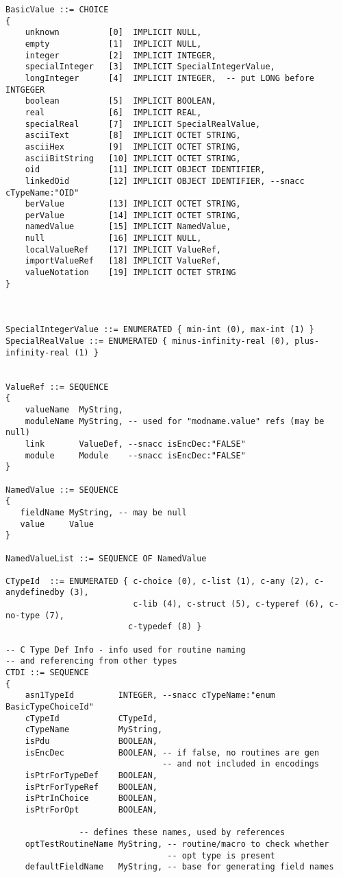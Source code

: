 \begin{small}
\begin{verbatim}
BasicValue ::= CHOICE
{
    unknown          [0]  IMPLICIT NULL,
    empty            [1]  IMPLICIT NULL,
    integer          [2]  IMPLICIT INTEGER,
    specialInteger   [3]  IMPLICIT SpecialIntegerValue,
    longInteger      [4]  IMPLICIT INTEGER,  -- put LONG before INTGEGER
    boolean          [5]  IMPLICIT BOOLEAN,
    real             [6]  IMPLICIT REAL,
    specialReal      [7]  IMPLICIT SpecialRealValue,
    asciiText        [8]  IMPLICIT OCTET STRING,
    asciiHex         [9]  IMPLICIT OCTET STRING,
    asciiBitString   [10] IMPLICIT OCTET STRING,
    oid              [11] IMPLICIT OBJECT IDENTIFIER,
    linkedOid        [12] IMPLICIT OBJECT IDENTIFIER, --snacc cTypeName:"OID"
    berValue         [13] IMPLICIT OCTET STRING,
    perValue         [14] IMPLICIT OCTET STRING,
    namedValue       [15] IMPLICIT NamedValue,
    null             [16] IMPLICIT NULL,
    localValueRef    [17] IMPLICIT ValueRef,
    importValueRef   [18] IMPLICIT ValueRef,
    valueNotation    [19] IMPLICIT OCTET STRING
}



SpecialIntegerValue ::= ENUMERATED { min-int (0), max-int (1) }
SpecialRealValue ::= ENUMERATED { minus-infinity-real (0), plus-infinity-real (1) }


ValueRef ::= SEQUENCE
{
    valueName  MyString,
    moduleName MyString, -- used for "modname.value" refs (may be null)
    link       ValueDef, --snacc isEncDec:"FALSE"
    module     Module    --snacc isEncDec:"FALSE"
}

NamedValue ::= SEQUENCE
{
   fieldName MyString, -- may be null
   value     Value
}

NamedValueList ::= SEQUENCE OF NamedValue

CTypeId  ::= ENUMERATED { c-choice (0), c-list (1), c-any (2), c-anydefinedby (3),
                          c-lib (4), c-struct (5), c-typeref (6), c-no-type (7),
                         c-typedef (8) }

-- C Type Def Info - info used for routine naming
-- and referencing from other types
CTDI ::= SEQUENCE
{
    asn1TypeId         INTEGER, --snacc cTypeName:"enum BasicTypeChoiceId"
    cTypeId            CTypeId,
    cTypeName          MyString,
    isPdu              BOOLEAN,
    isEncDec           BOOLEAN, -- if false, no routines are gen
                                -- and not included in encodings
    isPtrForTypeDef    BOOLEAN,
    isPtrForTypeRef    BOOLEAN,
    isPtrInChoice      BOOLEAN,
    isPtrForOpt        BOOLEAN,

               -- defines these names, used by references
    optTestRoutineName MyString, -- routine/macro to check whether
                                 -- opt type is present
    defaultFieldName   MyString, -- base for generating field names


\end{verbatim}
\end{small}
